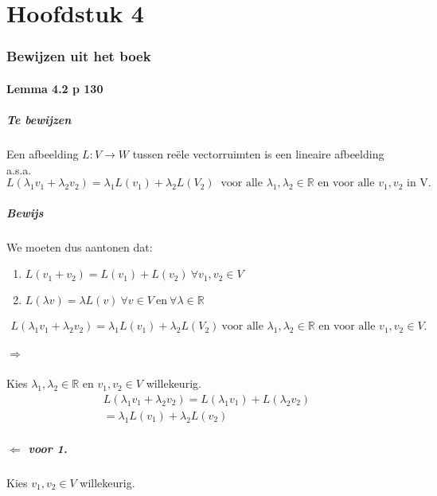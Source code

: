 \documentclass[lineaire_algebra_oplossingen.tex]{subfiles}
\begin{document}
\newpage
\part{Hoofdstuk 4}
\section{Bewijzen uit het boek}
\subsection{Lemma 4.2 p 130}
\subsubsection*{Te bewijzen}
Een afbeelding $L:V\rightarrow W$ tussen re\"ele vectorruimten is een lineaire afbeelding a.s.a.
$$L(\lambda_1v_1+\lambda_2v_2) = \lambda_1L(v_1)+\lambda_2L(V_2)\ \text{ voor alle } \lambda_1,\lambda_2 \in \mathbb{R} \text{ en voor alle } v_1,v_2 \text{ in V.}$$
\subsubsection*{Bewijs}
We moeten dus aantonen dat:
\begin{enumerate}
\item $L(v_1+v_2) = L(v_1) + L(v_2) \ \forall v_1,v_2 \in V$
\item $L(\lambda v) = \lambda L(v) \ \forall v \in V \ \text{en} \ \forall \lambda \in \mathbb{R}$
\end{enumerate}
\begin{align*}L(\lambda_1v_1+\lambda_2v_2) = \lambda_1L(v_1)+\lambda_2L(V_2)\ \text{voor alle $\lambda_1,\lambda_2 \in \mathbb{R}$ en voor alle $v_1,v_2 \in V$}. \tag{3.}
\end{align*}

\subsubsection*{$\Rightarrow$}
Kies $\lambda_1,\lambda_2 \in \mathbb{R}$ en $v_1,v_2 \in V$ willekeurig.
\begin{align*}
L(\lambda_1 v_1 + \lambda_2 v_2) = L(\lambda_1 v_1) + L(\lambda_2 v_2)\tag{wegens 1.}\\
=\lambda_1 L(v_1)+ \lambda_2 L(v_2) \tag{wegens 2.}
\end{align*}

\subsubsection*{$\Leftarrow$ voor 1.}
Kies $v_1,v_2 \in V$ willekeurig.
\end{document}
